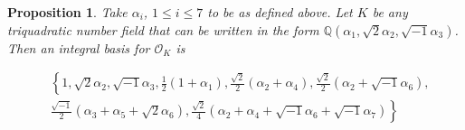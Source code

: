 \documentclass{amsart}
\newtheorem{Proposition}{Proposition}
\begin{document}
\begin{Proposition} Take $\alpha_i$, $1\leq i\leq 7$ to be as defined above. Let $K$ be any triquadratic number field that can be written in the form $\mathbb{Q}\left(\alpha_1,\sqrt{2} \alpha_2,\sqrt{-1}\alpha_3\right)$. Then an integral basis for $\mathcal{O}_K$ is



\begin{align*}
      & \left\{ 1,\sqrt{2}\alpha_2, \sqrt{-1}\alpha_3, \frac{1}{2}\left(1+\alpha_1\right), \frac{\sqrt{2}}{2}\left(\alpha_2 + \alpha_4\right), \frac{\sqrt{2}}{2}\left(\alpha_2 + \sqrt{-1}\alpha_6\right), \right. \\
      &  \left. \frac{\sqrt{-1}}{2}\left(\alpha_3 + \alpha_5 + \sqrt{2}\alpha_6\right), \frac{\sqrt{2}}{4}\left(\alpha_2 + \alpha_4 + \sqrt{-1}\alpha_6 + \sqrt{-1}\alpha_7\right) \right\}
\end{align*}






\end{Proposition}
\end{document}
